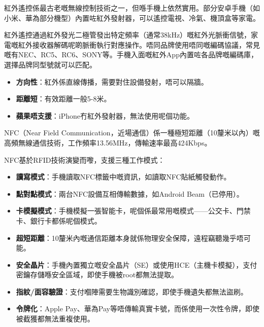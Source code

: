 
紅外遙控係最古老嘅無線控制技術之一，但喺手機上依然實用。部分安卓手機（如小米、華為部分機型）內置咗紅外發射器，可以遙控電視、冷氣、機頂盒等家電。


紅外遙控通過紅外發光二極管發出特定頻率（通常38kHz）嘅紅外光脈衝信號，家電嘅紅外接收器解碼呢啲脈衝執行對應操作。唔同品牌使用唔同嘅編碼協議，常見嘅有NEC、RC5、RC6、SONY等。手機入面嘅紅外App內置咗各品牌嘅編碼庫，選擇品牌同型號就可以匹配。


\begin{itemize}
  \item \textbf{方向性}：紅外係直線傳播，需要對住設備發射，唔可以隔牆。
  \item \textbf{距離短}：有效距離一般5-8米。
  \item \textbf{蘋果唔支援}：iPhone冇紅外發射器，無法使用呢個功能。
\end{itemize}


NFC（Near Field Communication，近場通信）係一種極短距離（10釐米以內）嘅高頻無線通信技術，工作頻率13.56MHz，傳輸速率最高424Kbps。


NFC基於RFID技術演變而嚟，支援三種工作模式：

\begin{itemize}
  \item \textbf{讀寫模式}：手機讀取NFC標籤中嘅資訊，如讀取NFC貼紙觸發動作。
  \item \textbf{點對點模式}：兩台NFC設備互相傳輸數據，如Android Beam（已停用）。
  \item \textbf{卡模擬模式}：手機模擬一張智能卡，呢個係最常用嘅模式——公交卡、門禁卡、銀行卡都係呢個模式。
\end{itemize}


\begin{itemize}
  \item \textbf{超短距離}：10釐米內嘅通信距離本身就係物理安全保障，遠程竊聽幾乎唔可能。
  \item \textbf{安全晶片}：手機內置獨立嘅安全晶片（SE）或使用HCE（主機卡模擬），支付密鑰存儲喺安全區域，即使手機被root都無法提取。
  \item \textbf{指紋/面容驗證}：支付嗰陣需要生物識別確認，即使手機遺失都無法盜刷。
  \item \textbf{令牌化}：Apple Pay、華為Pay等唔傳輸真實卡號，而係使用一次性令牌，即使被截獲都無法重複使用。
\end{itemize}

